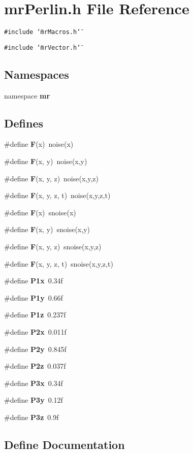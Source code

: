 \section{mr\-Perlin.h File Reference}
\label{mrPerlin_8h}
{\tt \#include \char`\"{}mr\-Macros.h\char`\"{}}\par
{\tt \#include \char`\"{}mr\-Vector.h\char`\"{}}\par
\subsection*{Namespaces}
\begin{CompactItemize}
\item 
namespace {\bf mr}
\end{CompactItemize}
\subsection*{Defines}
\begin{CompactItemize}
\item 
\#define {\bf F}(x)\ noise(x)
\item 
\#define {\bf F}(x, y)\ noise(x,y)
\item 
\#define {\bf F}(x, y, z)\ noise(x,y,z)
\item 
\#define {\bf F}(x, y, z, t)\ noise(x,y,z,t)
\item 
\#define {\bf F}(x)\ snoise(x)
\item 
\#define {\bf F}(x, y)\ snoise(x,y)
\item 
\#define {\bf F}(x, y, z)\ snoise(x,y,z)
\item 
\#define {\bf F}(x, y, z, t)\ snoise(x,y,z,t)
\item 
\#define {\bf P1x}\ 0.34f
\item 
\#define {\bf P1y}\ 0.66f
\item 
\#define {\bf P1z}\ 0.237f
\item 
\#define {\bf P2x}\ 0.011f
\item 
\#define {\bf P2y}\ 0.845f
\item 
\#define {\bf P2z}\ 0.037f
\item 
\#define {\bf P3x}\ 0.34f
\item 
\#define {\bf P3y}\ 0.12f
\item 
\#define {\bf P3z}\ 0.9f
\end{CompactItemize}


\subsection{Define Documentation}
